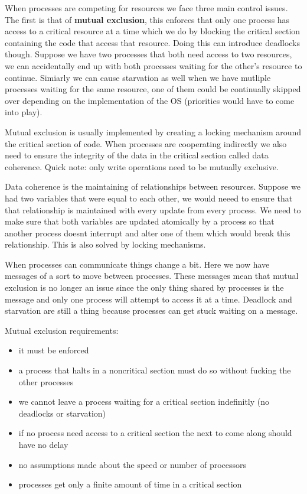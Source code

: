 \documentclass[12pt]{article}
\begin{document}
When processes are competing for resources we face three main control issues. The first is that of \textbf{mutual exclusion}, this enforces that only one process has access to a critical resource at a time which we do by blocking the critical section containing the code that access that resource. Doing this can introduce deadlocks though. Suppose we have two processes that both need access to two resources, we can accidentally end up with both processes waiting for the other's resource to continue. Simiarly we can cause starvation as well when we have mutliple processes waiting for the same resource, one of them could be continually skipped over depending on the implementation of the OS (priorities would have to come into play).

Mutual exclusion is usually implemented by creating a locking mechanism around the critical section of code. When processes are cooperating indirectly we also need to ensure the integrity of the data in the critical section called data coherence. Quick note: only write operations need to be mutually exclusive.

Data coherence is the maintaining of relationships between resources. Suppose we had two variables that were equal to each other, we would neeed to ensure that that relationship is maintained with every update from every process. We need to make sure that both variables are updated atomically by a process so that another process doesnt interrupt and alter one of them which would break this relationship. This is also solved by locking mechanisms.

When processes can communicate things change a bit. Here we now have messages of a sort to move between processes. These messages mean that mutual exclusion is no longer an issue since the only thing shared by processes is the message and only one process will attempt to access it at a time. Deadlock and starvation are still a thing because processes can get stuck waiting on a message.

Mutual exclusion requirements:
\begin{itemize}
    \item it must be enforced
    \item a process that halts in a noncritical section must do so without fucking the other processes
    \item we cannot leave a process waiting for a critical section indefinitly (no deadlocks or starvation)
    \item if no process need access to a critical section the next to come along should have no delay
    \item no assumptions made about the speed or number of processors
    \item processes get only a finite amount of time in a critical section
\end{itemize}
\end{document}
